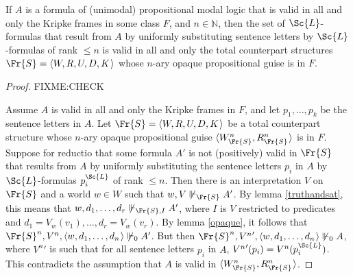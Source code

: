 \documentclass[11pt]{woarticle}
\theoremstyle{break}
\theoremstyle{nonumberplain}
\newcommand{\SAT}{\Vdash}
\newcommand{\1}{\;\,|\;\,}
\renewcommand{\t}[1]{\ensuremath{\langle #1  \makebox[.2ex]{}\rangle}}
\begin{document}
\begin{lemma}{\label{ncorrtrans}}
  If $A$ is a formula of (unimodal) propositional modal logic that is valid in
  all and only the Kripke frames in some class $F$, and $n \in \mathbb{N}$, then
  the set of $\Sc{L}$-formulas that result from $A$ by uniformly substituting
  sentence letters by $\Sc{L}$-formulas of rank $\leq n$ is valid in all and
  only the total counterpart structures $\Fr{S} = \t{W,R,U,D,K}$ whose $n$-ary
  opaque propositional guise is in $F$.
\end{lemma}

\begin{proof}
  FIXME:CHECK
  
  Assume $A$ is valid in all and only the Kripke frames in $F$, and let
  $p_1,\ldots,p_k$ be the sentence letters in $A$. Let $\Fr{S} = \t{W,R,U,D,K}$
  be a total counterpart structure whose $n$-ary opaque propositional guise
  $\t{W^n_{\Fr{S}}, R^n_{\Fr{S}}}$ is in $F$. Suppose for reductio that some
  formula $A'$ is not (positively) valid in $\Fr{S}$ that results from $A$ by
  uniformly substituting the sentence letters $p_i$ in $A$ by $\Sc{L}$-formulas
  $p_i^{\Sc{L}}$ of rank $\leq n$. Then there is an interpretation $V$ on
  $\Fr{S}$ and a world $w\in W$ such that $w,V \not\SAT_{\Fr{S}} A'$. By lemma
  \ref{truthandsat}, this means that $w,d_1,\ldots,d_r \not\SAT_{\Fr{S},I} A'$,
  where $I$ is $V$ restricted to predicates and
  $d_1=V_w(v_1),\ldots,d_r=V_w(v_r)$. By lemma \ref{opaque}, it follows that
  $\Fr{S}^n,V^n,\t{w,d_1,\ldots,d_n} \not\SAT_0 A'$. But then
  $\Fr{S}^n,{V^n}',\t{w,d_1,\ldots,d_n} \not\SAT_0 A$, where ${V^n}'$ is such
  that for all sentence letters $p_i$ in $A$, ${V^n}'(p_i) = V^n(p_i^{\Sc{L}})$.
  This contradicts the assumption that $A$ is valid in
  $\t{W^n_{\Fr{S}}, R^n_{\Fr{S}}}$.


\end{proof}
\end{document}

